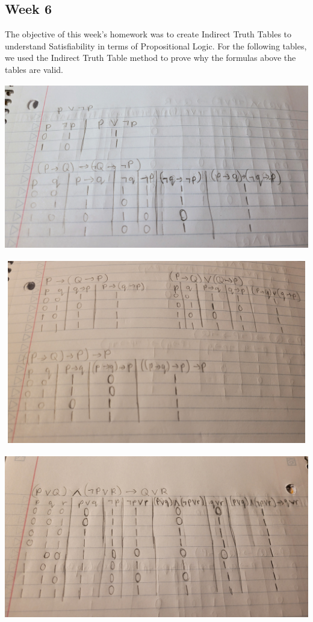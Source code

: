 \documentclass{article}
\theoremstyle{theorem}
\theoremstyle{definition}
\theoremstyle{remark}
\begin{document}
\subsection{Week 6}
The objective of this week's homework was to create Indirect Truth Tables to understand Satisfiability in terms of Propositional Logic. For the following tables, we used the Indirect Truth Table method to prove why the formulas above the tables are valid.
\\ \includegraphics[width=15cm, height=8cm]{Report Images/HW6_1.jpg}
\\ \includegraphics[width=15cm, height=8cm]{Report Images/HW6_2.jpg}
\\ \includegraphics[width=15cm, height=8cm]{Report Images/HW6_3.jpg}
\end{document}
